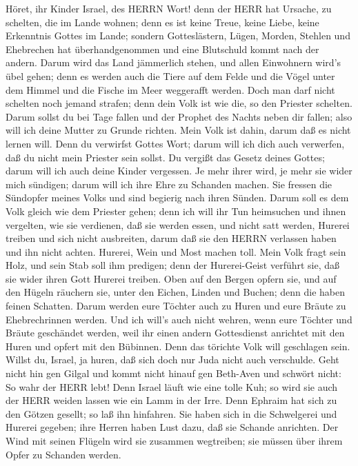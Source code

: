  Höret, ihr Kinder Israel, des HERRN Wort! denn der HERR hat
Ursache, zu schelten, die im Lande wohnen; denn es ist keine Treue,
keine Liebe, keine Erkenntnis Gottes im Lande;  sondern
Gotteslästern, Lügen, Morden, Stehlen und Ehebrechen hat
überhandgenommen und eine Blutschuld kommt nach der andern. 
Darum wird das Land jämmerlich stehen, und allen Einwohnern wird's übel
gehen; denn es werden auch die Tiere auf dem Felde und die Vögel unter
dem Himmel und die Fische im Meer weggerafft werden.  Doch
man darf nicht schelten noch jemand strafen; denn dein Volk ist wie die,
so den Priester schelten.  Darum sollst du bei Tage fallen
und der Prophet des Nachts neben dir fallen; also will ich deine Mutter
zu Grunde richten.  Mein Volk ist dahin, darum daß es nicht
lernen will. Denn du verwirfst Gottes Wort; darum will ich dich auch
verwerfen, daß du nicht mein Priester sein sollst. Du vergißt das Gesetz
deines Gottes; darum will ich auch deine Kinder vergessen. 
Je mehr ihrer wird, je mehr sie wider mich sündigen; darum will ich ihre
Ehre zu Schanden machen.  Sie fressen die Sündopfer meines
Volks und sind begierig nach ihren Sünden.  Darum soll es
dem Volk gleich wie dem Priester gehen; denn ich will ihr Tun heimsuchen
und ihnen vergelten, wie sie verdienen,  daß sie werden
essen, und nicht satt werden, Hurerei treiben und sich nicht ausbreiten,
darum daß sie den HERRN verlassen haben und ihn nicht achten.
 Hurerei, Wein und Most machen toll.  Mein
Volk fragt sein Holz, und sein Stab soll ihm predigen; denn der
Hurerei-Geist verführt sie, daß sie wider ihren Gott Hurerei treiben.
 Oben auf den Bergen opfern sie, und auf den Hügeln
räuchern sie, unter den Eichen, Linden und Buchen; denn die haben feinen
Schatten. Darum werden eure Töchter auch zu Huren und eure Bräute zu
Ehebrechrinnen werden.  Und ich will's auch nicht wehren,
wenn eure Töchter und Bräute geschändet werden, weil ihr einen andern
Gottesdienst anrichtet mit den Huren und opfert mit den Bübinnen. Denn
das törichte Volk will geschlagen sein.  Willst du, Israel,
ja huren, daß sich doch nur Juda nicht auch verschulde. Geht nicht hin
gen Gilgal und kommt nicht hinauf gen Beth-Aven und schwört nicht: So
wahr der HERR lebt!  Denn Israel läuft wie eine tolle Kuh;
so wird sie auch der HERR weiden lassen wie ein Lamm in der Irre.
 Denn Ephraim hat sich zu den Götzen gesellt; so laß ihn
hinfahren.  Sie haben sich in die Schwelgerei und Hurerei
gegeben; ihre Herren haben Lust dazu, daß sie Schande anrichten.
 Der Wind mit seinen Flügeln wird sie zusammen wegtreiben;
sie müssen über ihrem Opfer zu Schanden werden.

